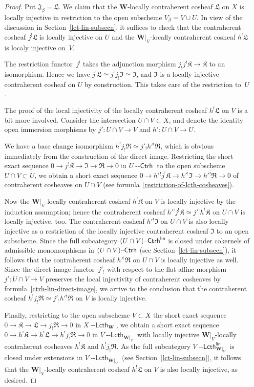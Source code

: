 \documentclass[12pt,a4paper]{amsart}
\newcommand{\+}{\nobreakdash-}
\renewcommand{\:}{\colon}
\newcommand{\rarrow}{\longrightarrow}
\newcommand{\Ctrh}{{\operatorname{\mathsf{--Ctrh}}}}
\newcommand{\Lcth}{{\operatorname{\mathsf{--Lcth}}}}
\newcommand{\lin}{\mathsf{lin}}
\newcommand{\bW}{\mathbf W}
\newcommand{\fI}{\mathfrak I}
\newcommand{\fJ}{\mathfrak J}
\newcommand{\fK}{\mathfrak K}
\newcommand{\fL}{\mathfrak L}
\newcommand{\fR}{\mathfrak R}
\theoremstyle{plain}
\theoremstyle{definition}
\begin{document}
\begin{proof}
 Put $\fJ_\beta=\fL$.
 We claim that the $\bW$\+locally contraherent cosheaf $\fL$ on $X$
is locally injective in restriction to the open subscheme
$V_\beta=V\cup U$.
 In view of the discussion in Section~\ref{lct-lin-subsecn}, it
suffices to check that the contraherent cosheaf $j^!\fL$ is
locally injective on $U$ and the $\bW|_V$\+locally contraherent
cosheaf $h^!\fL$ is localy injective on~$V$.

 The restriction functor~$j^!$ takes the adjunction morphism
$j_!j^!\fK\rarrow\fK$ to an isomorphism.
 Hence we have $j^!\fL\simeq j^!j_!\fI\simeq\fI$, and $\fI$ is
a locally injective contraherent cosheaf on $U$ by construction.
 This takes care of the restriction to~$U$.

 The proof of the local injectivity of the locally contraherent
cosheaf $h^!\fL$ on $V$ is a bit more involved.
 Consider the intersection $U\cap V\subset X$, and denote
the identity open immersion morphisms by $j'\:U\cap V\rarrow V$
and $h'\:U\cap V\rarrow U$.

 We have a base change isomorphism $h^!j_!\fR\simeq j'_!h'{}^!\fR$,
which is obvious immediately from the construction of the direct image.
 Restricting the short exact sequence $0\rarrow j^!\fK\rarrow\fI
\rarrow\fR\rarrow0$ in $U\Ctrh$ to the open subscheme
$U\cap V\subset U$, we obtain a short exact sequence
$0\rarrow h'{}^!j^!\fK\rarrow h'{}^!\fI\rarrow h'{}^!\fR\rarrow0$
of contraherent cosheaves on $U\cap V$ (see
formula~\eqref{restriction-of-lcth-cosheaves}).

 Now the $\bW|_V$\+locally contraherent cosheaf $h^!\fK$ on $V$
is locally injective by the induction assumption; hence
the contraherent cosheaf $h'{}^!j^!\fK\simeq j'{}^!h^!\fK$ on
$U\cap V$ is locally injective, too.
 The contraherent cosheaf $h'{}^!\fI$ on $U\cap V$ is also locally
injective as a restriction of the locally injective contraherent
cosheaf $\fI$ to an open subscheme.
 Since the full subcategory $(U\cap\nobreak V)\Ctrh^\lin$ is
closed under cokernels of admissible monomorphisms in
$(U\cap\nobreak V)\Ctrh$ (see Section~\ref{lct-lin-subsecn}),
it follows that the contraherent cosheaf $h'{}^!\fR$ on $U\cap V$
is locally injective as well.
 Since the direct image functor~$j'_!$ with respect to the flat affine
morphism $j'\:U\cap V\rarrow V$ preserves the local injectivity
of contraherent cosheaves by formula~\eqref{ctrh-lin-direct-image},
we arrive to the conclusion that the contraherent cosheaf
$h^!j_!\fR\simeq j'_!h'{}^!\fR$ on $V$ is locally injective.

 Finally, restricting to the open subscheme $V\subset X$ the short
exact sequence $0\rarrow\fK\rarrow\fL\rarrow j_!\fR\rarrow0$ in
$X\Lcth_\bW$, we obtain a short exact sequence $0\rarrow h^!\fK\rarrow
h^!\fL\rarrow h^!j_!\fR\rarrow0$ in $V\Lcth_{\bW|_V}$ with locally
injective $\bW|_V$\+locally contraherent cosheaves $h^!\fK$ and
$h^!j_!\fR$.
 As the full subcategory $V\Lcth^\lin_{\bW|_V}$ is closed under
extensions in $V\Lcth_{\bW|_V}$ (see Section~\ref{lct-lin-subsecn}),
it follows that the $\bW|_V$\+locally contraherent cosheaf $h^!\fL$
on $V$ is also locally injective, as desired.
\end{proof}
\end{document}
